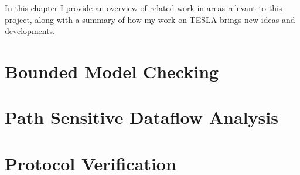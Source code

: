 In this chapter I provide an overview of related work in areas relevant
to this project, along with a summary of how my work on TESLA brings new
ideas and developments.

\section{Bounded Model Checking} \label{sec:bounded-model-checking}

\section{Path Sensitive Dataflow Analysis}

\section{Protocol Verification}

